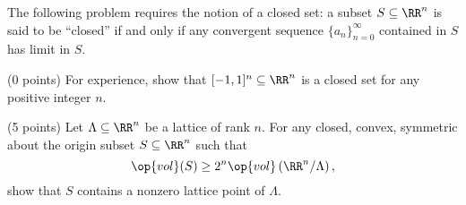 \documentclass[../notes.tex]{subfiles}
\begin{document}
\begin{prob}[5 points]
	The following problem requires the notion of a closed set: a subset $S\subseteq\RR^n$ is said to be ``closed'' if and only if any convergent sequence $\{a_n\}_{n=0}^\infty$ contained in $S$ has limit in $S$.
	\begin{listalph}
		\item (0 points) For experience, show that $[-1,1]^n\subseteq\RR^n$ is a closed set for any positive integer $n$.
		\item (5 points) Let $\Lambda\subseteq\RR^n$ be a lattice of rank $n$. For any closed, convex, symmetric about the origin subset $S\subseteq\RR^n$ such that
		\[\op{vol}(S)\ge2^n\op{vol}\left(\RR^n/\Lambda\right),\]
		show that $S$ contains a nonzero lattice point of $\Lambda$.
	\end{listalph}
\end{prob}
\end{document}

